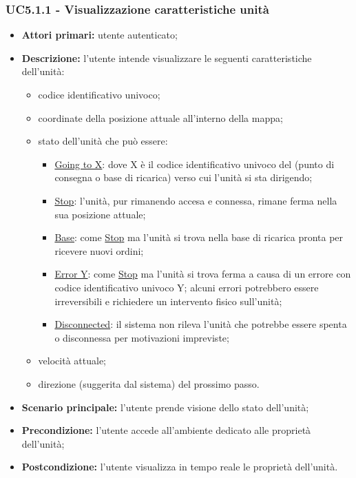         \subsubsection{UC5.1.1 - Visualizzazione caratteristiche unità}
        \begin{itemize}
            \item \textbf{Attori primari:} utente autenticato;
            \item \textbf{Descrizione:} l'utente intende visualizzare le seguenti caratteristiche dell'unità:
            \begin{itemize}
                \item codice identificativo univoco;
                \item coordinate della posizione attuale all'interno della mappa;
                \item stato dell'unità che può essere:
                \begin{itemize}
                    \item \underline{Going to X}: dove X è il codice identificativo univoco del  (punto di consegna o base di ricarica) verso cui l'unità si sta dirigendo;
                    \item \underline{Stop}: l'unità, pur rimanendo accesa e connessa, rimane ferma nella sua posizione attuale;
                    \item \underline{Base}: come \underline{Stop} ma l'unità si trova nella base di ricarica pronta per ricevere nuovi ordini;
                    \item \underline{Error Y}: come \underline{Stop} ma l'unità si trova ferma a causa di un errore con codice identificativo univoco Y; alcuni errori potrebbero essere irreversibili e richiedere un intervento fisico sull'unità;
                    \item \underline{Disconnected}: il sistema non rileva l'unità che potrebbe essere spenta o disconnessa per motivazioni impreviste;
                \end{itemize}
                \item velocità attuale;
                \item direzione (suggerita dal sistema) del prossimo passo.
            \end{itemize}
            \item \textbf{Scenario principale:} l'utente prende visione dello stato dell'unità;
            \item \textbf{Precondizione:} l'utente accede all'ambiente dedicato alle proprietà dell'unità;
            \item \textbf{Postcondizione:} l'utente visualizza in tempo reale le proprietà dell'unità.
        \end{itemize}

